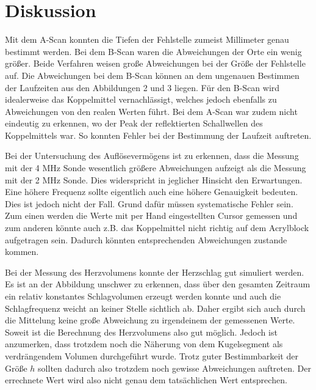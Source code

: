 \section{Diskussion}
\label{sec:Diskussion}

Mit dem A-Scan konnten die Tiefen der Fehlstelle zumeist Millimeter genau bestimmt werden. Bei dem
B-Scan waren die Abweichungen der Orte ein wenig größer. Beide Verfahren weisen große Abweichungen bei der
Größe der Fehlstelle auf. Die Abweichungen bei dem B-Scan können an dem ungenauen Bestimmen der Laufzeiten aus
den Abbildungen 2 und 3 liegen. Für den B-Scan wird idealerweise das Koppelmittel vernachlässigt, welches jedoch
ebenfalls zu Abweichungen von den realen Werten führt.
Bei dem A-Scan war zudem nicht eindeutig zu erkennen, wo der Peak der reflektierten Schallwellen des Koppelmittels war. So konnten
Fehler bei der Bestimmung der Laufzeit auftreten.

Bei der Untersuchung des Auflösevermögens ist zu erkennen, dass die Messung mit der 4 MHz Sonde wesentlich größere Abweichungen aufzeigt
als die Messung mit der 2 MHz Sonde. Dies widerspricht in jeglicher Hinsicht den Erwartungen. Eine höhere Frequenz sollte eigentlich auch
eine höhere Genauigkeit bedeuten. Dies ist jedoch nicht der Fall. Grund dafür müssen systematische Fehler sein. Zum einen werden die
Werte mit per Hand eingestellten Cursor gemessen und zum anderen könnte auch z.B. das Koppelmittel nicht richtig auf dem Acrylblock aufgetragen
sein. Dadurch könnten entsprechenden Abweichungen zustande kommen.

Bei der Messung des Herzvolumens konnte der Herzschlag gut simuliert werden. Es ist an der Abbildung unschwer zu erkennen, dass über den
gesamten Zeitraum ein relativ konstantes Schlagvolumen erzeugt werden konnte und auch die Schlagfrequenz weicht an keiner Stelle
sichtlich ab. Daher ergibt sich auch durch die Mittelung keine große Abweichung zu irgendeinem der gemessenen Werte. Soweit ist
die Berechnung des Herzvolumens also gut möglich. Jedoch ist anzumerken, dass trotzdem noch die Näherung von dem Kugelsegment
als verdrängendem Volumen durchgeführt wurde. Trotz guter Bestimmbarkeit der Größe $h$ sollten dadurch also trotzdem noch gewisse Abweichungen
auftreten. Der errechnete Wert wird also nicht genau dem tatsächlichen Wert entsprechen.
